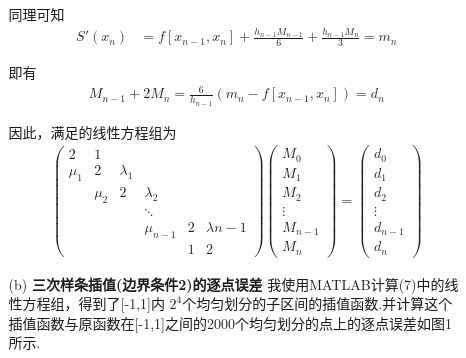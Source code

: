 \documentclass[12pt,a4paper,utf8]{ctexart}
\begin{document}
\begin{enumerate}
\begin{itemize}
    \par
    同理可知
    \begin{equation}
      \begin{aligned}
      S'(x_n) &= f[x_{n-1},x_n] + \frac{h_{n-1}M_{n-1}}{6} + \frac{h_{n-1}M_{n}}{3} = m_n \label{S'(x_0)}
      \end{aligned}
    \end{equation}
    \par
    即有
    \begin{equation}
      \begin{aligned}
      M_{n-1} + 2M_n = \frac{6}{h_{n-1}}(m_n - f[x_{n-1},x_n]) = d_n
      \end{aligned}
    \end{equation}
    \par
    因此，满足的线性方程组为
    \begin{equation}
      \begin{aligned}
      \begin{pmatrix}
        2 & 1 \\
        \mu_1 & 2     & \lambda_1 \\
              & \mu_2 & 2 & \lambda_2 \\
              &       &   & \ddots \\ 
              &       &   & \mu_{n-1} & 2 & \lambda{n-1} \\
              &       &      &     & 1 & 2 
      \end{pmatrix}
      \begin{pmatrix}
        M_0 \\
        M_1 \\
        M_2 \\
        \vdots \\
        M_{n-1} \\
        M_{n}
      \end{pmatrix} = 
      \begin{pmatrix}
        d_0 \\
        d_1 \\
        d_2 \\
        \vdots \\
        d_{n-1} \\
        d_{n}
      \end{pmatrix}
      \end{aligned}
    \end{equation}

    \item [(b)] \textbf{三次样条插值(边界条件2)的逐点误差}
    我使用MATLAB计算(7)中的线性方程组，得到了[-1,1]内 $2^4$个均匀划分的子区间的插值函数.并计算这个插值函数与原函数在[-1,1]之间的2000个均匀划分的点上的逐点误差如图1所示.


\end{itemize}
\end{enumerate}
\end{document}
